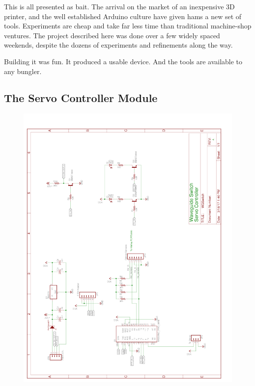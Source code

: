 \documentclass[12pt]{article}
\begin{document}
This is all presented as bait.  The arrival on the market of
an inexpensive 3D printer, and the well established Arduino
culture have given hams a new set of tools.  Experiments are
cheap and take far less time than traditional machine-shop
ventures. The project described here was done over a few
widely spaced weekends, despite the dozens of experiments
and refinements along the way.

Building it was fun. It produced a usable device. And the
tools are available to any bungler.

\clearpage

\begin{appendices}

\section{\label{a_controller_module}The Servo Controller Module}
\begin{figure}[h] 
  \centering
  \includegraphics[width=0.75\linewidth,keepaspectratio]{WGSwitch.pdf}
\end{figure} 
\clearpage

\end{appendices}
\end{document}
